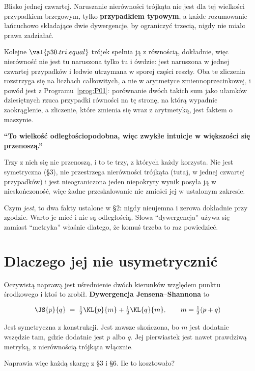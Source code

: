 \begin{fr}

Blisko jednej czwartej. Naruszanie nierówności trójkąta nie jest dla tej
wielkości przypadkiem brzegowym, tylko \textbf{przypadkiem typowym}, a każde
rozumowanie łańcuchowo składające dwie dywergencje, by ograniczyć trzecią,
nigdy nie miało prawa zadziałać.

Kolejne $\val{p30.tri.equal}$ trójek spełnia ją z równością, dokładnie, więc
nierówność nie jest tu naruszona tylko tu i ówdzie: jest naruszona w jednej
czwartej przypadków i ledwie utrzymana w sporej części reszty. Oba te
zliczenia rozstrzyga się na liczbach całkowitych, a nie w arytmetyce
zmiennoprzecinkowej, i powód jest z Programu~\ref{prog:P01}: porównanie
dwóch takich sum jako ułamków dziesiętnych rzuca przypadki równości na tę
stronę, na którą wypadnie zaokrąglenie, a zliczenie, które zmienia się wraz z
arytmetyką, jest faktem o maszynie.

\begin{trapbox}
\textbf{\enquote{To wielkość odległościopodobna, więc zwykłe intuicje w
większości się przenoszą.}}

Trzy z nich się nie przenoszą, i to te trzy, z których każdy korzysta. Nie
jest symetryczna (§3), nie przestrzega nierówności trójkąta (tutaj, w
jednej czwartej przypadków) i jest nieograniczona \dash{} jeden niepokryty
wynik posyła ją w nieskończoność, więc żadne przeskalowanie nie zmieści jej
w ustalonym zakresie.

Czym \emph{jest}, to dwa fakty ustalone w §2: nigdy nieujemna i zerowa
dokładnie przy zgodzie. Warto je mieć i nie są odległością. Słowa
\enquote{dywergencja} używa się zamiast \enquote{metryka} właśnie dlatego,
że komuś trzeba to raz powiedzieć.
\end{trapbox}

\end{fr}

\section{Dlaczego jej nie usymetrycznić}
\label{sec:P30-js}

\begin{fr}
Oczywistą naprawą jest uśrednienie dwóch kierunków względem punktu
środkowego i ktoś to zrobił. \textbf{Dywergencja Jensena--Shannona} to

\[ \JS{p}{q} \;=\; \tfrac12 \KL{p}{m} + \tfrac12 \KL{q}{m},
   \qquad m = \tfrac12(p + q) \]

Jest symetryczna z konstrukcji. Jest zawsze skończona, bo $m$ jest dodatnie
wszędzie tam, gdzie dodatnie jest $p$ albo $q$. Jej pierwiastek jest nawet
prawdziwą metryką, z nierównością trójkąta włącznie.

Naprawia więc każdą skargę z §3 i §6. Ile to kosztowało?
\dotline
\nextframe
\end{fr}

